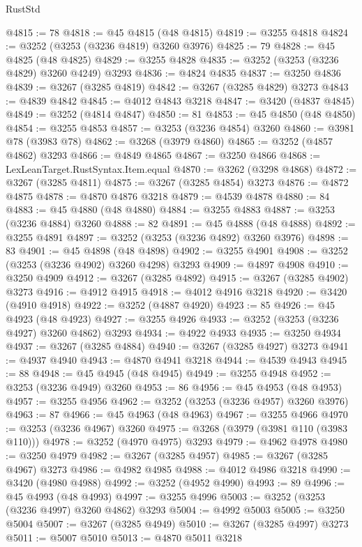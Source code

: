 \begin{lexlean}{RustStd}
\begin{coremodule}
@4815 := 78
@4818 := @45 @4815 (@48 @4815)
@4819 := @3255 @4818
@4824 := @3252 (@3253 (@3236 @4819) @3260 @3976)
@4825 := 79
@4828 := @45 @4825 (@48 @4825)
@4829 := @3255 @4828
@4835 := @3252 (@3253 (@3236 @4829) @3260 @4249) @3293
@4836 := @4824 @4835
@4837 := @3250 @4836
@4839 := @3267 (@3285 @4819)
@4842 := @3267 (@3285 @4829) @3273
@4843 := @4839 @4842
@4845 := @4012 @4843 @3218
@4847 := @3420 (@4837 @4845)
@4849 := @3252 (@4814 @4847)
@4850 := 81
@4853 := @45 @4850 (@48 @4850)
@4854 := @3255 @4853
@4857 := @3253 (@3236 @4854) @3260
@4860 := @3981 @78 (@3983 @78)
@4862 := @3268 (@3979 @4860)
@4865 := @3252 (@4857 @4862) @3293
@4866 := @4849 @4865
@4867 := @3250 @4866
@4868 := LexLeanTarget.RustSyntax.Item.equal
@4870 := @3262 (@3298 @4868)
@4872 := @3267 (@3285 @4811)
@4875 := @3267 (@3285 @4854) @3273
@4876 := @4872 @4875
@4878 := @4870 @4876 @3218
@4879 := @4539 @4878
@4880 := 84
@4883 := @45 @4880 (@48 @4880)
@4884 := @3255 @4883
@4887 := @3253 (@3236 @4884) @3260
@4888 := 82
@4891 := @45 @4888 (@48 @4888)
@4892 := @3255 @4891
@4897 := @3252 (@3253 (@3236 @4892) @3260 @3976)
@4898 := 83
@4901 := @45 @4898 (@48 @4898)
@4902 := @3255 @4901
@4908 := @3252 (@3253 (@3236 @4902) @3260 @4298) @3293
@4909 := @4897 @4908
@4910 := @3250 @4909
@4912 := @3267 (@3285 @4892)
@4915 := @3267 (@3285 @4902) @3273
@4916 := @4912 @4915
@4918 := @4012 @4916 @3218
@4920 := @3420 (@4910 @4918)
@4922 := @3252 (@4887 @4920)
@4923 := 85
@4926 := @45 @4923 (@48 @4923)
@4927 := @3255 @4926
@4933 := @3252 (@3253 (@3236 @4927) @3260 @4862) @3293
@4934 := @4922 @4933
@4935 := @3250 @4934
@4937 := @3267 (@3285 @4884)
@4940 := @3267 (@3285 @4927) @3273
@4941 := @4937 @4940
@4943 := @4870 @4941 @3218
@4944 := @4539 @4943
@4945 := 88
@4948 := @45 @4945 (@48 @4945)
@4949 := @3255 @4948
@4952 := @3253 (@3236 @4949) @3260
@4953 := 86
@4956 := @45 @4953 (@48 @4953)
@4957 := @3255 @4956
@4962 := @3252 (@3253 (@3236 @4957) @3260 @3976)
@4963 := 87
@4966 := @45 @4963 (@48 @4963)
@4967 := @3255 @4966
@4970 := @3253 (@3236 @4967) @3260
@4975 := @3268 (@3979 (@3981 @110 (@3983 @110)))
@4978 := @3252 (@4970 @4975) @3293
@4979 := @4962 @4978
@4980 := @3250 @4979
@4982 := @3267 (@3285 @4957)
@4985 := @3267 (@3285 @4967) @3273
@4986 := @4982 @4985
@4988 := @4012 @4986 @3218
@4990 := @3420 (@4980 @4988)
@4992 := @3252 (@4952 @4990)
@4993 := 89
@4996 := @45 @4993 (@48 @4993)
@4997 := @3255 @4996
@5003 := @3252 (@3253 (@3236 @4997) @3260 @4862) @3293
@5004 := @4992 @5003
@5005 := @3250 @5004
@5007 := @3267 (@3285 @4949)
@5010 := @3267 (@3285 @4997) @3273
@5011 := @5007 @5010
@5013 := @4870 @5011 @3218

\end{coremodule}
\end{lexlean}
